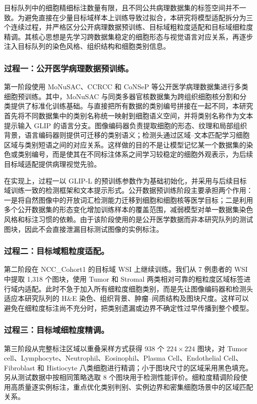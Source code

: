 目标队列中的细胞精细标注数量有限，且不同公共病理数据集的标签空间并不一致。为避免直接在少量目标域样本上训练导致过拟合，本研究将模型适配拆分为三个连续过程，并严格区分公开病理数据预训练、目标域粗粒度适配和目标域细粒度精调。其核心思想是先学习跨数据集稳定的细胞形态与视觉语言对应关系，再逐步注入目标队列的染色风格、组织结构和细胞类别信息。

\subsubsection{过程一：公开医学病理数据预训练。}
第一阶段使用 MoNuSAC、CCRCC 和 CoNSeP 等公开医学病理数据集进行多类细胞预训练。其中，MoNuSAC 与同类多器官核数据集为跨组织细胞核分割和分类提供了标准化训练基础\cite{verma2021monusac,gamper2019pannuke,graham2021lizard}。与直接把所有数据的类别编号拼接在一起不同，本研究首先将不同数据集中的类别名称统一映射到细胞语义空间，并将类别名称作为文本提示输入 GLIP 的语言分支。图像编码器负责提取细胞的形态、纹理和局部组织背景，语言编码器则提供可迁移的类别语义；检测头通过区域--文本匹配学习细胞区域与类别短语之间的对应关系。这样做的目的不是让模型记忆某一个数据集的染色或类别编号，而是使其在不同标注体系之间学习较稳定的细胞外观表示，为后续目标域适配提供病理视觉先验。

在实现上，过程一以 GLIP-L 的预训练参数作为基础初始化，并采用与后续目标域训练一致的检测框架和文本提示形式。公开数据预训练阶段主要承担两个作用：一是将自然图像中的开放词汇检测能力迁移到细胞和细胞核等医学目标；二是利用多个公开数据集的形态变化增加训练样本的覆盖范围，减弱模型对单一数据集染色风格和标注习惯的依赖。由于该阶段使用的是公开医学数据而非本研究队列的测试图块，因此不会直接泄漏目标测试图像的实例标注。

\subsubsection{过程二：目标域粗粒度适配。}
第二阶段在 NCC\_Cohort1 的目标域 WSI 上继续训练。我们从 7 例患者的 WSI 中提取 1,318 个图块，使用 Tumor 和 Stromal 两类相对可靠的粗粒度区域标签进行域内适配。此时不急于加入所有细粒度细胞类别，而是先让图像编码器和检测头适应本研究队列的 H\&E 染色、组织背景、肿瘤--间质结构及图块尺度。这样可以避免在细粒度标注尚不充分时，把类别遗漏或边界不确定性过早传播到整个模型。

\subsubsection{过程三：目标域细粒度精调。}
第三阶段从完整标注区域以重叠采样方式获得 938 个 $224\times224$ 图块，对 Tumor cell、Lymphocyte、Neutrophil、Eosinophil、Plasma Cell、Endothelial Cell、Fibroblast 和 Histiocyte 八类细胞进行精调；小于图块尺寸的区域采用黑色填充。另从测试数据中按相同策略选取 8 个图块用于检测性能评价。细粒度精调阶段使用高质量逐实例标注，重点优化类别判别、实例边界和密集细胞场景中的区域匹配关系。

